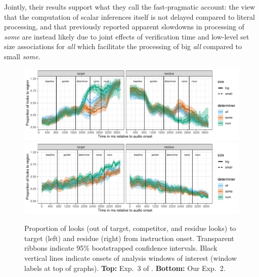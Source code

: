 \documentclass[10pt,letterpaper]{article}
\newcommand{\expref}[1]{Exp.~#1}
\begin{document}
Jointly, their results support what they call the fast-pragmatic account: the view that the computation of scalar inferences itself is not delayed compared to literal processing, and that previously reported apparent slowdowns in processing of \emph{some} are instead likely due to joint effects of verification time and low-level set size associations for \emph{all} which facilitate the processing of big \emph{all} compared to small \emph{some}. 

\begin{figure}[tbh!]
\centering
\includegraphics[width=\textwidth]{../../analysis/SunBreheny/1_incremental/main/graphs/proportions_condsize_withresidue_tr.pdf}
\includegraphics[width=\textwidth]{../../analysis/SunBreheny/2_webgazer/main/graphs/proportions_condsize_withresidue_tr.pdf}
\caption{Proportion of looks (out of target, competitor, and residue looks) to target (left) and residue (right) from instruction onset. Transparent ribbons indicate 95\% bootstrapped confidence intervals. Black vertical lines indicate onsets of analysis windows of interest (window labels at top of graphs). \textbf{Top:} \expref{3} of . \textbf{Bottom:} Our \expref{2}.}
\label{fig:results-original}
\end{figure}
\end{document}
